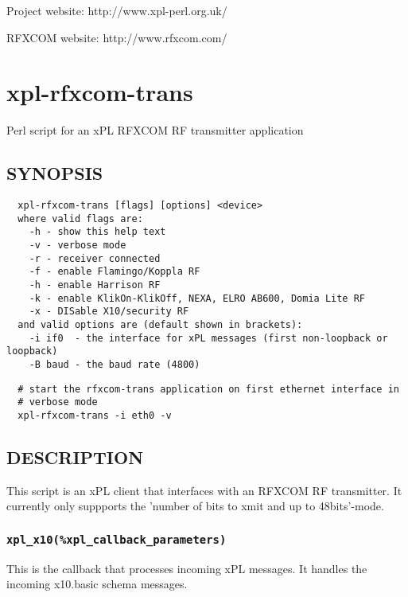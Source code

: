 Project website: http://www.xpl-perl.org.uk/



RFXCOM website: http://www.rfxcom.com/

\section{xpl-rfxcom-trans\label{xpl-rfxcom-trans}}


Perl script for an xPL RFXCOM RF transmitter application

\subsection*{SYNOPSIS\label{xpl-rfxcom-trans_SYNOPSIS}}
\begin{verbatim}
  xpl-rfxcom-trans [flags] [options] <device>
  where valid flags are:
    -h - show this help text
    -v - verbose mode
    -r - receiver connected
    -f - enable Flamingo/Koppla RF
    -h - enable Harrison RF
    -k - enable KlikOn-KlikOff, NEXA, ELRO AB600, Domia Lite RF
    -x - DISable X10/security RF
  and valid options are (default shown in brackets):
    -i if0  - the interface for xPL messages (first non-loopback or loopback)
    -B baud - the baud rate (4800)
\end{verbatim}
\begin{verbatim}
  # start the rfxcom-trans application on first ethernet interface in
  # verbose mode
  xpl-rfxcom-trans -i eth0 -v
\end{verbatim}
\subsection*{DESCRIPTION\label{xpl-rfxcom-trans_DESCRIPTION}}


This script is an xPL client that interfaces with an RFXCOM RF
transmitter.  It currently only suppports the 'number of bits to xmit
and up to 48bits'-mode.

\subsubsection*{\texttt{xpl\_x10(\%xpl\_callback\_parameters)}\label{xpl-rfxcom-trans_xpl_x10_xpl_callback_parameters_}}


This is the callback that processes incoming xPL messages.  It handles
the incoming x10.basic schema messages.

